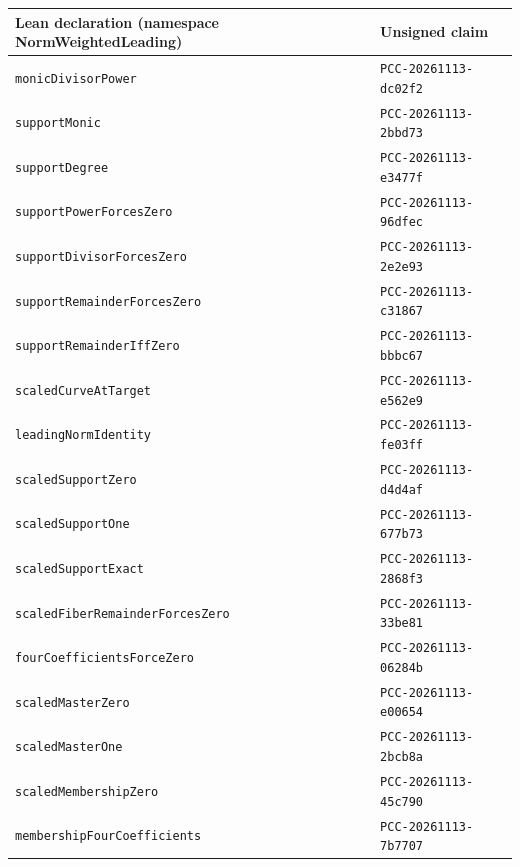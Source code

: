 \documentclass[
  10pt,
]{article}
\begin{document}
\begin{longtable}[]{@{}ll@{}}
\toprule\noalign{}
Lean declaration (namespace NormWeightedLeading) & Unsigned claim \\
\midrule\noalign{}
\endhead
\bottomrule\noalign{}
\endlastfoot
\texttt{monicDivisorPower} & \texttt{PCC-20261113-dc02f2} \\
\texttt{supportMonic} & \texttt{PCC-20261113-2bbd73} \\
\texttt{supportDegree} & \texttt{PCC-20261113-e3477f} \\
\texttt{supportPowerForcesZero} & \texttt{PCC-20261113-96dfec} \\
\texttt{supportDivisorForcesZero} & \texttt{PCC-20261113-2e2e93} \\
\texttt{supportRemainderForcesZero} & \texttt{PCC-20261113-c31867} \\
\texttt{supportRemainderIffZero} & \texttt{PCC-20261113-bbbc67} \\
\texttt{scaledCurveAtTarget} & \texttt{PCC-20261113-e562e9} \\
\texttt{leadingNormIdentity} & \texttt{PCC-20261113-fe03ff} \\
\texttt{scaledSupportZero} & \texttt{PCC-20261113-d4d4af} \\
\texttt{scaledSupportOne} & \texttt{PCC-20261113-677b73} \\
\texttt{scaledSupportExact} & \texttt{PCC-20261113-2868f3} \\
\texttt{scaledFiberRemainderForcesZero} &
\texttt{PCC-20261113-33be81} \\
\texttt{fourCoefficientsForceZero} & \texttt{PCC-20261113-06284b} \\
\texttt{scaledMasterZero} & \texttt{PCC-20261113-e00654} \\
\texttt{scaledMasterOne} & \texttt{PCC-20261113-2bcb8a} \\
\texttt{scaledMembershipZero} & \texttt{PCC-20261113-45c790} \\
\texttt{membershipFourCoefficients} & \texttt{PCC-20261113-7b7707} \\
\end{longtable}
\end{document}
